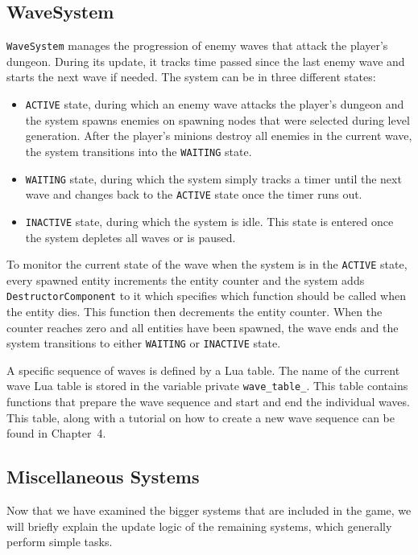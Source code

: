 \subsection{WaveSystem}

\texttt{WaveSystem} manages the progression of enemy waves that attack the player's dungeon. During its update, it tracks time passed
since the last enemy wave and starts the next wave if needed. The system can be in three different states:

\begin{itemize}
    \item \texttt{ACTIVE} state, during which  an enemy wave attacks the player's
        dungeon and the system spawns enemies on spawning nodes that were selected during level generation. After the player's minions destroy
        all enemies in the current wave, the system transitions into the \texttt{WAITING} state.
    \item \texttt{WAITING} state, during which the system simply tracks a timer until the next wave and changes back to the \texttt{ACTIVE}
        state once the timer runs out.
    \item \texttt{INACTIVE} state, during which the system is idle. This state is entered once the system depletes all waves or is paused.
\end{itemize}

To monitor the current state of the wave when the system is in the \texttt{ACTIVE} state, every spawned entity increments the entity
counter and the system adds \texttt{DestructorComponent} to it which specifies which function should be called when the entity dies.
This function then decrements the entity counter. When the counter reaches zero and all entities have been spawned, the wave ends and
the system transitions to either \texttt{WAITING} or \texttt{INACTIVE} state.

A specific sequence of waves is defined by a Lua table. The name of the current wave Lua table is stored in the variable private
\texttt{wave\_table\_}. This table contains functions that prepare the wave sequence and start and end the individual waves. This table,
along with a tutorial on how to create a new wave sequence can be found in Chapter~4.

\subsection{Miscellaneous Systems}

Now that we have examined the bigger systems that are included in the game, we will briefly explain the update logic of the remaining
systems, which generally perform simple tasks.

